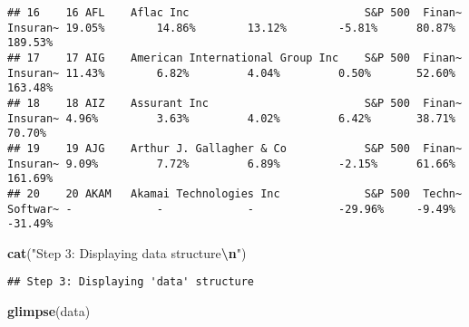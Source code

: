\documentclass[
]{article}
\newenvironment{Shaded}{\begin{snugshade}}{\end{snugshade}}
\newcommand{\FunctionTok}[1]{\textcolor[rgb]{0.13,0.29,0.53}{\textbf{#1}}}
\newcommand{\NormalTok}[1]{#1}
\newcommand{\SpecialCharTok}[1]{\textcolor[rgb]{0.81,0.36,0.00}{\textbf{#1}}}
\newcommand{\StringTok}[1]{\textcolor[rgb]{0.31,0.60,0.02}{#1}}
\begin{document}
\begin{verbatim}
## 16    16 AFL    Aflac Inc                           S&P 500  Finan~ Insuran~ 19.05%        14.86%        13.12%        -5.81%      80.87%    189.53%  
## 17    17 AIG    American International Group Inc    S&P 500  Finan~ Insuran~ 11.43%        6.82%         4.04%         0.50%       52.60%    163.48%  
## 18    18 AIZ    Assurant Inc                        S&P 500  Finan~ Insuran~ 4.96%         3.63%         4.02%         6.42%       38.71%    70.70%   
## 19    19 AJG    Arthur J. Gallagher & Co            S&P 500  Finan~ Insuran~ 9.09%         7.72%         6.89%         -2.15%      61.66%    161.69%  
## 20    20 AKAM   Akamai Technologies Inc             S&P 500  Techn~ Softwar~ -             -             -             -29.96%     -9.49%    -31.49%
\end{verbatim}

\begin{Shaded}
\begin{Highlighting}[]
\FunctionTok{cat}\NormalTok{(}\StringTok{"Step 3: Displaying \textquotesingle{}data\textquotesingle{} structure}\SpecialCharTok{\textbackslash{}n}\StringTok{"}\NormalTok{)}
\end{Highlighting}
\end{Shaded}

\begin{verbatim}
## Step 3: Displaying 'data' structure
\end{verbatim}

\begin{Shaded}
\begin{Highlighting}[]
\FunctionTok{glimpse}\NormalTok{(data)}
\end{Highlighting}
\end{Shaded}
\end{document}

